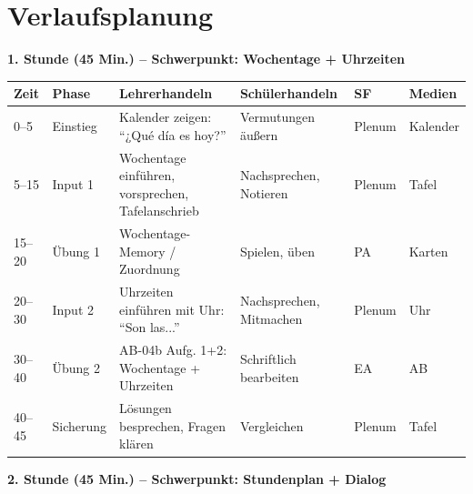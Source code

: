 \documentclass[11pt,a4paper]{article}
\begin{document}
\section{Verlaufsplanung}

\textbf{1. Stunde (45 Min.) -- Schwerpunkt: Wochentage + Uhrzeiten}

\begin{longtable}{|p{1cm}|p{1.5cm}|p{4cm}|p{3cm}|p{2cm}|p{2cm}|}
\hline
\textbf{Zeit} & \textbf{Phase} & \textbf{Lehrerhandeln} & \textbf{Schülerhandeln} & \textbf{SF} & \textbf{Medien} \\
\hline
\endhead

0--5 & Einstieg & Kalender zeigen: ``¿Qué día es hoy?'' & Vermutungen äußern & Plenum & Kalender \\
\hline

5--15 & Input 1 & Wochentage einführen, vorsprechen, Tafelanschrieb & Nachsprechen, Notieren & Plenum & Tafel \\
\hline

15--20 & Übung 1 & Wochentage-Memory / Zuordnung & Spielen, üben & PA & Karten \\
\hline

20--30 & Input 2 & Uhrzeiten einführen mit Uhr: ``Son las...'' & Nachsprechen, Mitmachen & Plenum & Uhr \\
\hline

30--40 & Übung 2 & AB-04b Aufg. 1+2: Wochentage + Uhrzeiten & Schriftlich bearbeiten & EA & AB \\
\hline

40--45 & Sicherung & Lösungen besprechen, Fragen klären & Vergleichen & Plenum & Tafel \\
\hline
\end{longtable}

\vspace{1em}

\textbf{2. Stunde (45 Min.) -- Schwerpunkt: Stundenplan + Dialog}
\end{document}
